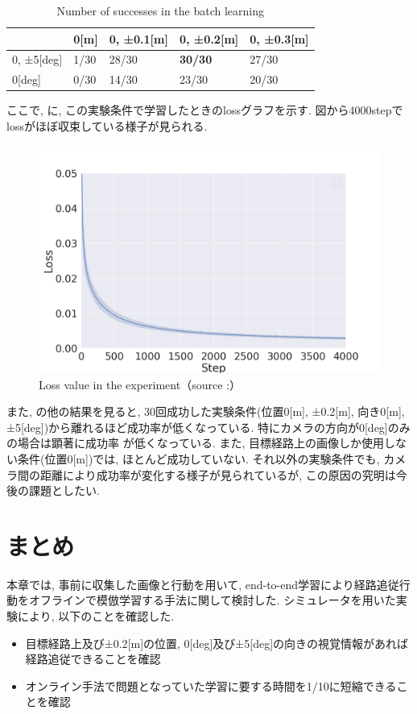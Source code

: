 \begin{table}[h]
  \centering
  \caption{Number of successes in the batch learning}
  \begin{tabular}{|p{2cm}|p{2cm}|p{2cm}|p{2cm}|p{2cm}|} \hline
     & 0[m] & 0, ±0.1[m] & 0, ±0.2[m] & 0, ±0.3[m] \\ \hline
    0, ±5[deg] & 1/30 & 28/30 & \bf30/30 & 27/30 \\ \hline
    0[deg] & 0/30 & 14/30 & 23/30 & 20/30 \\ \hline
  \end{tabular}
  \label{tb:exp1}
\end{table}

ここで, に, この実験条件で学習したときのlossグラフを示す. 図から4000stepでlossがほぼ収束している様子が見られる. 

\newpage
\begin{figure}[h]
  \centering
  \includegraphics[keepaspectratio, scale=0.3]{images/loss_00_02_4000.png}
  \caption{Loss value in the experiment（source :\cite{offline}）}
  \label{Fig:loss_00_02_4000}
  \end{figure}

また, の他の結果を見ると, 30回成功した実験条件(位置0[m], ±0.2[m], 向き0[m], ±5[deg])から離れるほど成功率が低くなっている. 特にカメラの方向が0[deg]のみの場合は顕著に成功率
が低くなっている. また, 目標経路上の画像しか使用しない条件(位置0[m])では, ほとんど成功していない. それ以外の実験条件でも, カメラ間の距離により成功率が変化する様子が見られているが, この原因の究明は今後の課題としたい. 

\section{まとめ}
本章では, 事前に収集した画像と行動を用いて, end-to-end学習により経路追従行動をオフラインで模倣学習する手法に関して検討した. シミュレータを用いた実験により, 以下のことを確認した. 

\begin{itemize}
  \item 目標経路上及び±0.2[m]の位置, 0[deg]及び±5[deg]の向きの視覚情報があれば経路追従できることを確認
  \item オンライン手法で問題となっていた学習に要する時間を1/10に短縮できることを確認
\end{itemize}